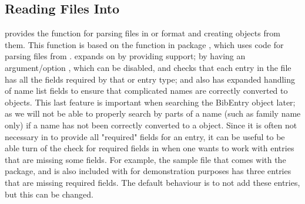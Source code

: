 \documentclass[article]{jss}\usepackage[]{graphicx}\usepackage[]{color}
\newcommand{\ourpkg}{\pkg{RefManageR}}
\begin{document}
\subsection[Reading .bib Files Into R]{Reading  Files Into \R{}} 
\ourpkg{} provides the function  for parsing  files in \Biblatex{} or \Bibtex{} format and creating  objects from them.  This function is based on the  function in package  \citep{Rbibtex}, which uses code for parsing \Bibtex{} files from \citet{bibparser}.   expands on  by providing \Biblatex{} support; by having an argument/option , which can be disabled, and checks that each entry in the file has all the fields required by that \Biblatex{} or \Bibtex{} entry type; and also has expanded handling of name list fields to ensure that complicated names are correctly converted to  objects.  This last feature is important when searching the BibEntry object later; as we will not be able to properly search by parts of a name (such as family name only) if a name has not been correctly converted to a  object.  Since it is often not necessary in \Biblatex{} to provide all "required" fields for an entry, it can be useful to be able turn of the check for required fields in \R{} when one wants to work with entries that are missing some fields.  For example, the sample  file that comes with the \Biblatex{} package, and is also included with \ourpkg{} for demonstration purposes has three entries that are missing required fields.  The default behaviour is to not add these entries, but this can be changed.
\end{document}
